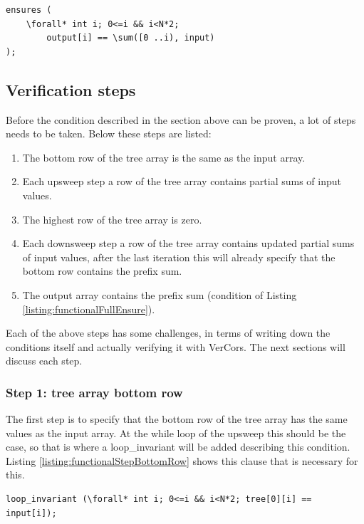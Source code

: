 \documentclass[a4paper]{article}
\begin{document}
\begin{lstlisting}[caption=Ensure clause of the program that should be proven eventually, label=listing:functionalFullEnsure, float=htpb]
ensures (
	\forall* int i; 0<=i && i<N*2; 
		output[i] == \sum([0 ..i), input)
);
\end{lstlisting}

\subsection{Verification steps}
Before the condition described in the section above can be proven, a lot of steps needs to be taken. Below these steps are listed:
\begin{enumerate}
	\item The bottom row of the tree array is the same as the input array.
	\item Each upsweep step a row of the tree array contains partial sums of input values.
	\item The highest row of the tree array is zero.
	\item Each downsweep step a row of the tree array contains updated partial sums of input values, after the last iteration this will already specify that the bottom row contains the prefix sum.
	\item The output array contains the prefix sum (condition of Listing \ref{listing:functionalFullEnsure}).
\end{enumerate}

Each of the above steps has some challenges, in terms of writing down the conditions itself and actually verifying it with VerCors. The next sections will discuss each step.

\subsubsection{Step 1: tree array bottom row}
The first step is to specify that the bottom row of the tree array has the same values as the input array. At the while loop of the upsweep this should be the case, so that is where a loop\_invariant will be added describing this condition. Listing \ref{listing:functionalStepBottomRow} shows this clause that is necessary for this.

\begin{lstlisting}[caption=Bottom row of the tree array is equal to the input array, label=listing:functionalStepBottomRow, float=htpb]
loop_invariant (\forall* int i; 0<=i && i<N*2; tree[0][i] == input[i]);
\end{lstlisting}
\end{document}
